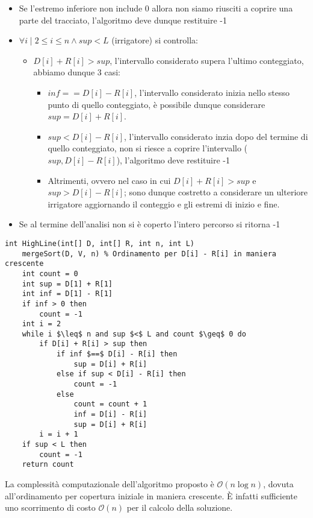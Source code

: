 \documentclass[../cheatSheetAlgoritmi.tex]{subfiles}
\begin{document}
\begin{itemize}
    \item Se l'estremo inferiore non include 0 allora non siamo riusciti a coprire una parte del tracciato, l'algoritmo deve dunque restituire -1
    \item $\forall i \mid 2 \leq i \leq n \land sup < L$ (irrigatore) si controlla:
    \begin{itemize}
        \item $D[i] + R[i] > sup$, l'intervallo considerato supera l'ultimo conteggiato, abbiamo dunque 3 casi:
        \begin{itemize}
            \item $inf == D[i] - R[i]$, l'intervallo considerato inizia nello stesso punto di quello conteggiato, è possibile dunque considerare $sup = D[i] + R[i]$.
            \item $sup < D[i] - R[i]$, l'intervallo considerato inzia dopo del termine di quello conteggiato, non si riesce a coprire l'intervallo ($sup, D[i] - R[i]$), l'algoritmo deve restituire -1
            \item Altrimenti, ovvero nel caso in cui $D[i] + R[i] > sup$ e $sup > D[i] - R[i]$; sono dunque costretto a considerare un ulteriore irrigatore aggiornando il conteggio e gli estremi di inizio e fine.
        \end{itemize}
    \end{itemize}
    \item Se al termine dell'analisi non si è coperto l'intero percorso si ritorna -1
\end{itemize}
\begin{lstlisting}[caption=HighLine]
int HighLine(int[] D, int[] R, int n, int L)
    mergeSort(D, V, n) % Ordinamento per D[i] - R[i] in maniera crescente
    int count = 0
    int sup = D[1] + R[1]
    int inf = D[1] - R[1]
    if inf > 0 then
        count = -1
    int i = 2 
    while i $\leq$ n and sup $<$ L and count $\geq$ 0 do 
        if D[i] + R[i] > sup then
            if inf $==$ D[i] - R[i] then
                sup = D[i] + R[i]
            else if sup < D[i] - R[i] then
                count = -1
            else 
                count = count + 1
                inf = D[i] - R[i]
                sup = D[i] + R[i]
        i = i + 1
    if sup < L then
        count = -1
    return count
\end{lstlisting}
La complessità computazionale dell'algoritmo proposto è $\mathcal{O}(n\log n)$, dovuta all'ordinamento per copertura iniziale in maniera crescente. È infatti sufficiente uno scorrimento di costo $\mathcal{O}(n)$ per il calcolo della soluzione.
\end{document}
